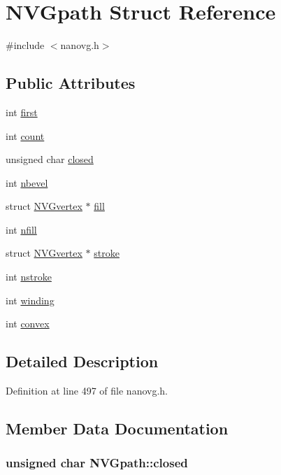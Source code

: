 \hypertarget{struct_n_v_gpath}{\section{N\+V\+Gpath Struct Reference}
\label{struct_n_v_gpath}
}


{\ttfamily \#include $<$nanovg.\+h$>$}

\subsection*{Public Attributes}
\begin{DoxyCompactItemize}
\item 
int \hyperlink{struct_n_v_gpath_a6f0776a67e3e60ab285a4e2686f5b45c}{first}
\item 
int \hyperlink{struct_n_v_gpath_a65bfb8db6e411e19a2dfc36336e5ed85}{count}
\item 
unsigned char \hyperlink{struct_n_v_gpath_a9951e19e1e502d56e5b16acaa9348f14}{closed}
\item 
int \hyperlink{struct_n_v_gpath_ac3e9a66a5132bfc42e19694c5548b2fb}{nbevel}
\item 
struct \hyperlink{struct_n_v_gvertex}{N\+V\+Gvertex} $\ast$ \hyperlink{struct_n_v_gpath_ae218c0d5d0f90aee93558e51c3279afe}{fill}
\item 
int \hyperlink{struct_n_v_gpath_a1301e4eaf5ae42646eb25295f9e1ccd8}{nfill}
\item 
struct \hyperlink{struct_n_v_gvertex}{N\+V\+Gvertex} $\ast$ \hyperlink{struct_n_v_gpath_a3376451a0d636e69cfb1e8988feaf780}{stroke}
\item 
int \hyperlink{struct_n_v_gpath_ab855f1ca7f88f871410a9c326fe4f207}{nstroke}
\item 
int \hyperlink{struct_n_v_gpath_aefa1aea3e295c4934fe89b5e1eb58e59}{winding}
\item 
int \hyperlink{struct_n_v_gpath_a85833dcd230251fdc7a3f75335c08e8f}{convex}
\end{DoxyCompactItemize}


\subsection{Detailed Description}


Definition at line 497 of file nanovg.\+h.



\subsection{Member Data Documentation}
\hypertarget{struct_n_v_gpath_a9951e19e1e502d56e5b16acaa9348f14}{
\subsubsection[{closed}]{\setlength{\rightskip}{0pt plus 5cm}unsigned char N\+V\+Gpath\+::closed}}\label{struct_n_v_gpath_a9951e19e1e502d56e5b16acaa9348f14}


